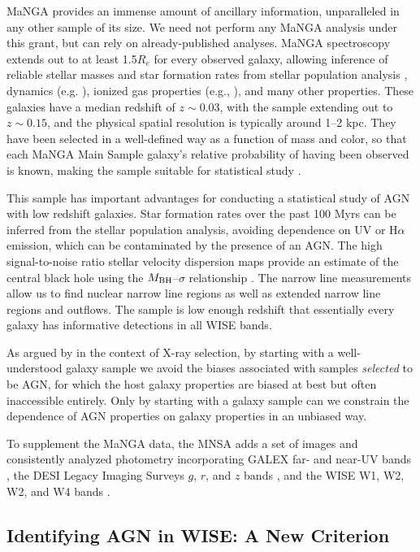 \documentclass[12pt, preprint]{hacked-aastex}
\begin{document}
MaNGA provides an immense amount of ancillary information,
unparalleled in any other sample of its size. We need not perform any
MaNGA analysis under this grant, but can rely on already-published
analyses. MaNGA spectroscopy extends out to at least 1.5$R_e$ for
every observed galaxy, allowing inference of reliable stellar masses
and star formation rates from stellar population analysis
\cite{sanchez22a}, dynamics (e.g. \cite{graham18a}), ionized gas
properties (e.g., \cite{belfiore17a}), and many other properties.
These galaxies have a median redshift of $z\sim0.03$, with the sample
extending out to $z\sim 0.15$, and the physical spatial resolution is
typically around 1--2 kpc. They have been selected in a well-defined
way as a function of mass and color, so that each MaNGA Main Sample
galaxy's relative probability of having been observed is known, making
the sample suitable for statistical study \cite{wake17a}.

This sample has important advantages for conducting a statistical
study of AGN with low redshift galaxies.  Star formation rates over
the past 100 Myrs can be inferred from the stellar population
analysis, avoiding dependence on UV or H$\alpha$ emission, which can
be contaminated by the presence of an AGN. The high signal-to-noise
ratio stellar velocity dispersion maps provide an estimate of the
central black hole using the $M_{\rm BH}$--$\sigma$ relationship
\cite{kormendy04b}. The narrow line measurements allow us to find
nuclear narrow line regions as well as extended narrow line regions
and outflows. The sample is low enough redshift that essentially every
galaxy has informative detections in all WISE bands.

As argued by \cite{aird12a} in the context of X-ray selection, by
starting with a well-understood galaxy sample we avoid the biases
associated with samples {\it selected} to be AGN, for which the host
galaxy properties are biased at best but often inaccessible
entirely. Only by starting with a galaxy sample can we constrain the
dependence of AGN properties on galaxy properties in an unbiased way.

To supplement the MaNGA data, the MNSA adds a set of images and
consistently analyzed photometry incorporating GALEX far- and near-UV
bands \cite{martin05a}, the DESI Legacy Imaging Surveys $g$, $r$, and
$z$ bands \cite{dey19a}, and the WISE W1, W2, W2, and W4 bands
\cite{wright10a}.

\subsection{Identifying AGN in WISE: A New Criterion}
\label{sec:criterion}
\end{document}

